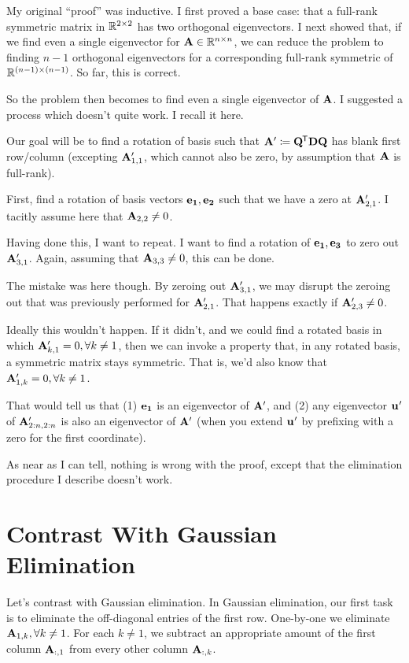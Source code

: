 \documentclass[11pt, oneside]{amsart}
\begin{document}
My original ``proof'' was inductive. I first proved a base case: that a
full-rank symmetric matrix in $\mathbb{R}^{2 \times 2}$ has two orthogonal
eigenvectors. I next showed that, if we find even a single eigenvector
for $\mathbf{A} \in \mathbb{R}^{n \times n}$, we can reduce the problem to finding $n-1$
orthogonal eigenvectors for a corresponding full-rank symmetric of
$\mathbb{R}^{(n-1) \times (n-1)}$. So far, this is correct.

So the problem then becomes to find even a single eigenvector of
$\mathbf{A}$. I suggested a process which doesn't quite work. I recall it
here.

Our goal will be to find a rotation of basis such that $\mathbf{A}' \coloneqq
\mathbf{Q}^{\mkern-1.5mu\mathsf{T}}\mathbf{D}\mathbf{Q}$ has blank first row/column (excepting $\mathbf{A}'_{1, 1}$, which
cannot also be zero, by assumption that $\mathbf{A}$ is full-rank).

First, find a rotation of basis vectors $\mathbf{e}_{\mathbf{1}}, \mathbf{e}_{\mathbf{2}}$ such that
we have a zero at $\mathbf{A}'_{2, 1}$. I tacitly assume here that $\mathbf{A}_{2,
2} \ne 0$.

Having done this, I want to repeat. I want to find a rotation of
$\mathbf{e}_{\mathbf{1}}, \mathbf{e}_{\mathbf{3}}$ to zero out $\mathbf{A}'_{3, 1}$. Again, assuming that
$\mathbf{A}_{3, 3} \ne 0$, this can be done.

The mistake was here though. By zeroing out $\mathbf{A}'_{3, 1}$, we may
disrupt the zeroing out that was previously performed for $\mathbf{A}'_{2,
1}$. That happens exactly if $\mathbf{A}'_{2, 3} \ne 0$.

Ideally this wouldn't happen. If it didn't, and we could find a rotated
basis in which $\mathbf{A}'_{k, 1} = 0, \forall k\ne 1$, then we can invoke a
property that, in any rotated basis, a symmetric matrix stays symmetric.
That is, we'd also know that $\mathbf{A}'_{1, k} = 0, \forall k\ne 1$.

That would tell us that (1) $\mathbf{e}_{\mathbf{1}}$ is an eigenvector of $\mathbf{A}'$,
and (2) any eigenvector $\mathbf{u_{\mathbf{}}}'$ of $\mathbf{A}'_{2:n, 2:n}$ is also an
eigenvector of $\mathbf{A}'$ (when you extend $\mathbf{u_{\mathbf{}}}'$ by prefixing with a
zero for the first coordinate).

As near as I can tell, nothing is wrong with the proof, except that the
elimination procedure I describe doesn't work.

\section{Contrast With Gaussian Elimination}

Let's contrast with Gaussian elimination. In Gaussian elimination, our
first task is to eliminate the off-diagonal entries of the first row.
One-by-one we eliminate $\mathbf{A}_{1, k}, \forall k \ne 1$. For each $k \ne
1$, we subtract an appropriate amount of the first column $\mathbf{A}_{:, 1}$
from every other column $\mathbf{A}_{:, k}$.
\end{document}
